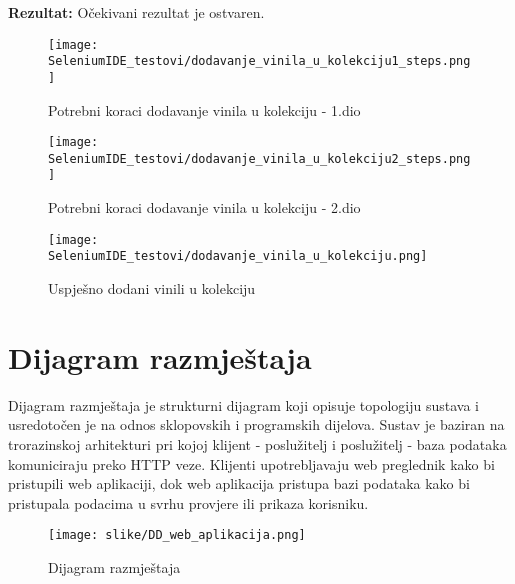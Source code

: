 				\noindent\textbf{Rezultat:} Očekivani rezultat je ostvaren. 
				
				\begin{figure}[H]
					\texttt{[image: SeleniumIDE\_testovi/dodavanje\_vinila\_u\_kolekciju1\_steps.png]}
					\centering
					\caption{Potrebni koraci dodavanje vinila u kolekciju - 1.dio}
					\label{fig:dodavanje_vinila1_steps}
				\end{figure}
				
				\begin{figure}[H]
					\texttt{[image: SeleniumIDE\_testovi/dodavanje\_vinila\_u\_kolekciju2\_steps.png]}
					\centering
					\caption{Potrebni koraci dodavanje vinila u kolekciju - 2.dio}
					\label{fig:dodavanje_vinila2_steps}
				\end{figure}
				
				\begin{figure}[H]
					\texttt{[image: SeleniumIDE\_testovi/dodavanje\_vinila\_u\_kolekciju.png]}
					\centering
					\caption{Uspješno dodani vinili u kolekciju}
					\label{fig:kolekcija}
				\end{figure}
			
			\eject 
		
		
		\section{Dijagram razmještaja}
			
%			

		Dijagram razmještaja je strukturni dijagram koji opisuje topologiju sustava i usredotočen je na odnos sklopovskih i programskih dijelova. Sustav je baziran na trorazinskoj arhitekturi pri kojoj klijent - poslužitelj i poslužitelj - baza podataka komuniciraju preko HTTP veze. Klijenti upotrebljavaju web preglednik kako bi pristupili web aplikaciji, dok web aplikacija pristupa bazi podataka kako bi pristupala podacima u svrhu provjere ili prikaza korisniku.

				\begin{figure}[H]
					\texttt{[image: slike/DD\_web\_aplikacija.png]}
					\centering
					\caption{Dijagram razmještaja}
					\label{fig:dig_razmjestaja}
				\end{figure}
			
